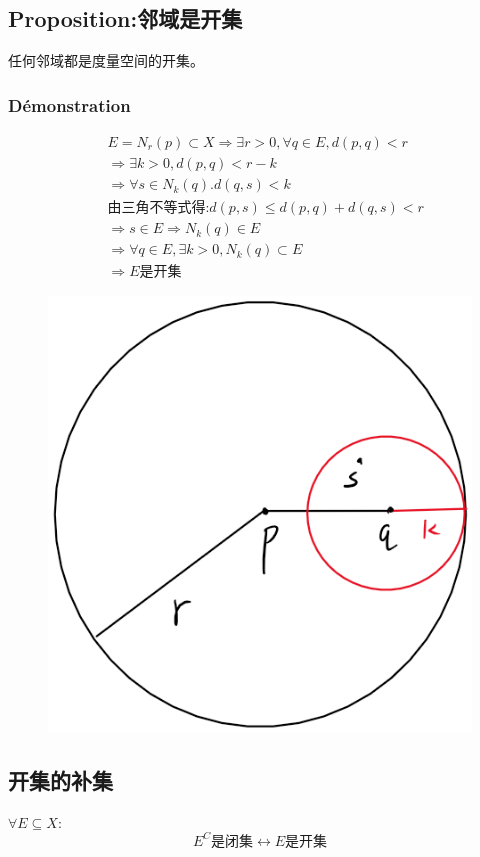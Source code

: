 \documentclass[12pt, a4paper, oneside]{ctexbook}
\begin{document}
  \subsection{Proposition:邻域是开集}
  任何邻域都是度量空间的开集。
  \subsubsection{Démonstration}
  $$
  \begin{aligned}&
  E=N_r(p)\subset X\Rightarrow \exists r>0, \forall q\in E,d(p,q)<r\\ &
  \Rightarrow \exists k>0,d(p,q)<r-k\\ &
  \Rightarrow \forall s\in N_k(q).d(q,s)<k\\ &
  \text{由三角不等式得:}d(p,s)\leq d(p,q)+d(q,s)<r\\ &
  \Rightarrow s\in E\Rightarrow N_k(q)\in E\\ &
  \Rightarrow \forall q\in E, \exists k>0 , N_k(q)\subset E\\ &
  \Rightarrow E\text{是开集}
  \end{aligned}
  $$
  \begin{figure}[H]%
    \centering
    \includegraphics[scale=0.5]{linyushikaiji.png}
    \label{邻域是开集的几何解释}
  \end{figure}

  \subsection{开集的补集}
  $\forall E\subseteq X:$
  $$
  E^C\text{是闭集}\leftrightarrow E\text{是开集}
  $$
\end{document}
